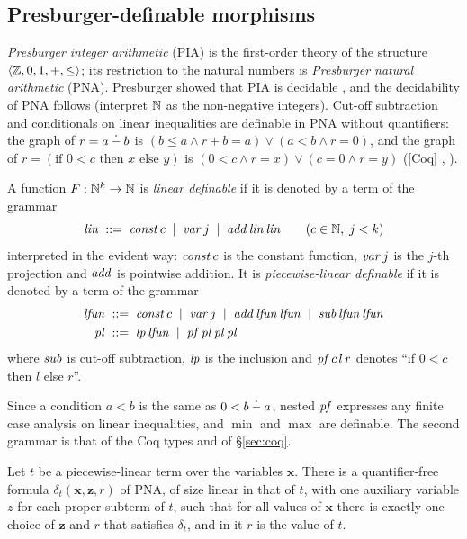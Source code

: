 \documentclass{fundam}
\begin{document}
\subsection{Presburger-definable morphisms}\label{sec:presburger}

\emph{Presburger integer arithmetic} (PIA) is the first-order theory of the structure
$\langle \mathbb{Z}, 0, 1, +, \le \rangle$; its restriction to the natural numbers is
\emph{Presburger natural arithmetic} (PNA).  Presburger showed that PIA is decidable
\cite{Presburger29}, and the decidability of PNA follows (interpret $\mathbb{N}$ as the
non-negative integers).  Cut-off subtraction and conditionals on linear inequalities are
definable in PNA without quantifiers: the graph of $r = a \mathbin{\dot{-}} b$ is
$(b \le a \wedge r + b = a) \vee (a < b \wedge r = 0)$, and the graph of
$r = (\text{if } 0 < c \text{ then } x \text{ else } y)$ is
$(0 < c \wedge r = x) \vee (c = 0 \wedge r = y)$
(\textsf{[Coq]} , ).

\begin{definition}\label{def:lfun}
  A function $F : \mathbb{N}^k \to \mathbb{N}$ is \emph{linear definable} if it is denoted by a term of
  the grammar
  \[
    \mathit{lin} \;::=\; \mathit{const}\,c \;\mid\; \mathit{var}\,j \;\mid\; \mathit{add}\,\mathit{lin}\,\mathit{lin}
    \qquad (c \in \mathbb{N},\; j < k)
  \]
  interpreted in the evident way: $\mathit{const}\,c$ is the constant function,
  $\mathit{var}\,j$ is the $j$-th projection and $\mathit{add}$ is pointwise addition.  It is
  \emph{piecewise-linear definable} if it is denoted by a term of the grammar
  \begin{align*}
    \mathit{lfun} \;&::=\; \mathit{const}\,c \;\mid\; \mathit{var}\,j \;\mid\;
       \mathit{add}\,\mathit{lfun}\,\mathit{lfun} \;\mid\; \mathit{sub}\,\mathit{lfun}\,\mathit{lfun} \\
    \mathit{pl} \;&::=\; \mathit{lp}\,\mathit{lfun} \;\mid\; \mathit{pf}\,\mathit{pl}\,\mathit{pl}\,\mathit{pl}
  \end{align*}
  where $\mathit{sub}$ is cut-off subtraction, $\mathit{lp}$ is the inclusion and
  $\mathit{pf}\,c\,l\,r$ denotes ``if $0 < c$ then $l$ else $r$''.
\end{definition}

Since a condition $a < b$ is the same as $0 < b \mathbin{\dot{-}} a$, nested $\mathit{pf}$ expresses any
finite case analysis on linear inequalities, and $\min$ and $\max$ are definable.  The
second grammar is that of the Coq types  and  of \S\ref{sec:coq}.

\begin{lemma}[Definability]\label{lem:qf}
  Let $t$ be a piecewise-linear term over the variables $\mathbf{x}$.  There is a
  quantifier-free formula $\delta_t(\mathbf{x}, \mathbf{z}, r)$ of PNA, of size linear in
  that of $t$, with one auxiliary variable $z$ for each proper subterm of $t$, such that
  for all values of $\mathbf{x}$ there is exactly one choice of $\mathbf{z}$ and $r$ that
  satisfies $\delta_t$, and in it $r$ is the value of $t$.
\end{lemma}
\end{document}
